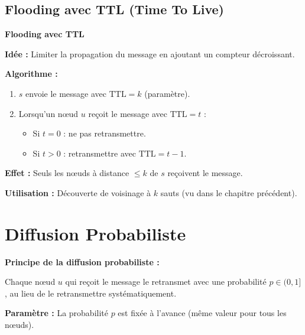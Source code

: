 \documentclass[12pt,a4paper]{article}
\begin{document}
\subsection{Flooding avec TTL (Time To Live)}

\begin{algorithme}
\textbf{Flooding avec TTL}

\textbf{Idée :} Limiter la propagation du message en ajoutant un compteur décroissant.

\textbf{Algorithme :}
\begin{enumerate}
    \item $s$ envoie le message avec $\text{TTL} = k$ (paramètre).
    \item Lorsqu'un nœud $u$ reçoit le message avec $\text{TTL} = t$ :
    \begin{itemize}
        \item Si $t = 0$ : ne pas retransmettre.
        \item Si $t > 0$ : retransmettre avec $\text{TTL} = t - 1$.
    \end{itemize}
\end{enumerate}

\textbf{Effet :} Seuls les nœuds à distance $\leq k$ de $s$ reçoivent le message.

\textbf{Utilisation :} Découverte de voisinage à $k$ sauts (vu dans le chapitre précédent).
\end{algorithme}

\newpage

\section{Diffusion Probabiliste}

\begin{definition}
\textbf{Principe de la diffusion probabiliste :}

Chaque nœud $u$ qui reçoit le message le retransmet avec une probabilité $p \in (0, 1]$, au lieu
de le retransmettre systématiquement.

\textbf{Paramètre :} La probabilité $p$ est fixée à l'avance (même valeur pour tous les nœuds).
\end{definition}
\end{document}
